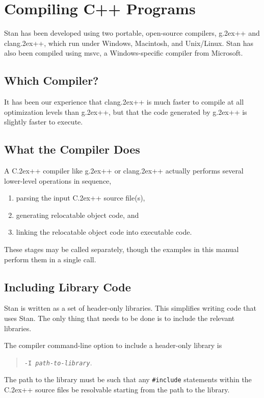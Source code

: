 \documentclass[10pt]{report}
\newcommand{\Stan}{Stan\xspace}
\newcommand*{\Cpp}{C\raise.2ex\hbox{\footnotesize ++}\xspace} %
\newcommand{\clang}{{\ttfamily clang\raise.2ex\hbox{\footnotesize ++}}\xspace}
\newcommand{\gpp}{{\ttfamily g\raise.2ex\hbox{\footnotesize ++}}\xspace}
\newcommand{\acronym}[1]{{\sc #1}\xspace}
\newcommand{\MSVC}{\acronym{msvc}}
\newcommand{\code}[1]{{\tt #1}}
\begin{document}
\chapter{Compiling C++ Programs}\label{compiling-cpp.chapter}

\Stan has been developed using two portable, open-source compilers,
\gpp and \clang, which run under Windows, Macintosh, and Unix/Linux.
\Stan has also been compiled using \MSVC, a Windows-specific compiler
from Microsoft.


\section{Which Compiler?}

It has been our experience that \clang is much faster to
compile at all optimization levels than \gpp, but that the code
generated by \gpp is slightly faster to execute.

\section{What the Compiler Does}

A \Cpp compiler like \gpp or \clang actually performs several
lower-level operations in sequence,
% 
\begin{enumerate}
\item
parsing the input \Cpp source file(s), 
\item 
generating relocatable object code, and
\item 
linking the relocatable object code into executable code.
\end{enumerate}
%
These stages may be called separately, though the examples in
this manual perform them in a single call.


\section{Including Library Code}

\Stan is written as a set of header-only libraries.  This simplifies
writing code that uses Stan.  The only thing that needs to be done
is to include the relevant libraries.  

The compiler command-line option to include a
header-only library is 
%
\begin{quote}
\code{-I {\slshape path-to-library}}.
\end{quote}
%
The path to the library must be such that any \code{\#include}
statements within the \Cpp source files be resolvable starting from
the path to the library.  
\end{document}

